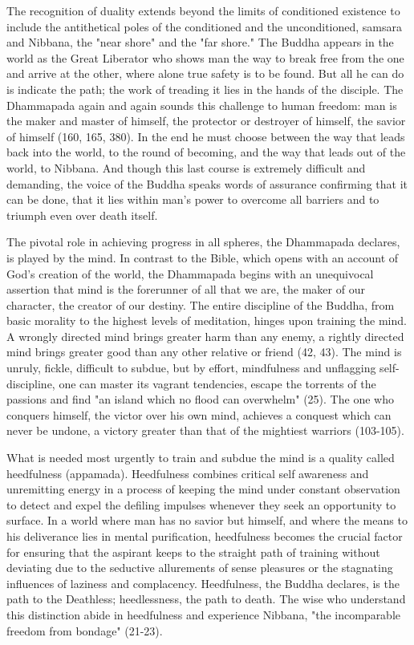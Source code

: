The recognition of duality extends beyond the limits of conditioned existence to include the antithetical poles of the conditioned and the unconditioned, samsara and Nibbana, the "near shore" and the "far shore." The Buddha appears in the world as the Great Liberator who shows man the way to break free from the one and arrive at the other, where alone true safety is to be found. But all he can do is indicate the path; the work of treading it lies in the hands of the disciple. The Dhammapada again and again sounds this challenge to human freedom: man is the maker and master of himself, the protector or destroyer of himself, the savior of himself (160, 165, 380). In the end he must choose between the way that leads back into the world, to the round of becoming, and the way that leads out of the world, to Nibbana. And though this last course is extremely difficult and demanding, the voice of the Buddha speaks words of assurance confirming that it can be done, that it lies within man's power to overcome all barriers and to triumph even over death itself.

The pivotal role in achieving progress in all spheres, the Dhammapada declares, is played by the mind. In contrast to the Bible, which opens with an account of God's creation of the world, the Dhammapada begins with an unequivocal assertion that mind is the forerunner of all that we are, the maker of our character, the creator of our destiny. The entire discipline of the Buddha, from basic morality to the highest levels of meditation, hinges upon training the mind. A wrongly directed mind brings greater harm than any enemy, a rightly directed mind brings greater good than any other relative or friend (42, 43). The mind is unruly, fickle, difficult to subdue, but by effort, mindfulness and unflagging self-discipline, one can master its vagrant tendencies, escape the torrents of the passions and find "an island which no flood can overwhelm" (25). The one who conquers himself, the victor over his own mind, achieves a conquest which can never be undone, a victory greater than that of the mightiest warriors (103-105).

What is needed most urgently to train and subdue the mind is a quality called heedfulness (appamada). Heedfulness combines critical self awareness and unremitting energy in a process of keeping the mind under constant observation to detect and expel the defiling impulses whenever they seek an opportunity to surface. In a world where man has no savior but himself, and where the means to his deliverance lies in mental purification, heedfulness becomes the crucial factor for ensuring that the aspirant keeps to the straight path of training without deviating due to the seductive allurements of sense pleasures or the stagnating influences of laziness and complacency. Heedfulness, the Buddha declares, is the path to the Deathless; heedlessness, the path to death. The wise who understand this distinction abide in heedfulness and experience Nibbana, "the incomparable freedom from bondage" (21-23).

